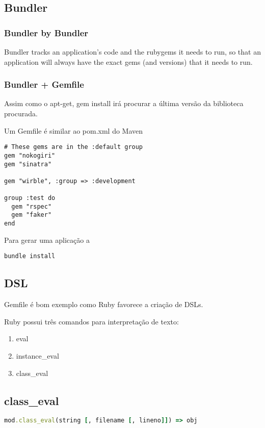 \documentclass[serif,mathserif]{article}
\begin{document}
\subsection{Bundler}

\subsubsection{Bundler by Bundler}

Bundler tracks an application's code and the rubygems it needs to run, so that an application will always have the exact gems (and versions) that it needs to run.

\subsubsection{Bundler + Gemfile}

Assim como o apt-get, gem install irá procurar a última versão da biblioteca procurada.

Um Gemfile é similar ao pom.xml do Maven

\begin{lstlisting}
# These gems are in the :default group
gem "nokogiri"
gem "sinatra"

gem "wirble", :group => :development

group :test do
  gem "rspec"
  gem "faker"
end
\end{lstlisting}

Para gerar uma aplicação a 
\begin{verbatim}
bundle install
\end{verbatim}

\subsection {DSL}
Gemfile é bom exemplo como Ruby favorece a criação de DSLs.

Ruby possui três comandos para interpretação de texto:
\begin{enumerate}
  \item eval
  \item instance\_eval
  \item class\_eval
\end{enumerate}

\subsection{class\_eval}
\begin{lstlisting}[language=ruby]
mod.class_eval(string [, filename [, lineno]]) => obj
\end{lstlisting}
\end{document}
